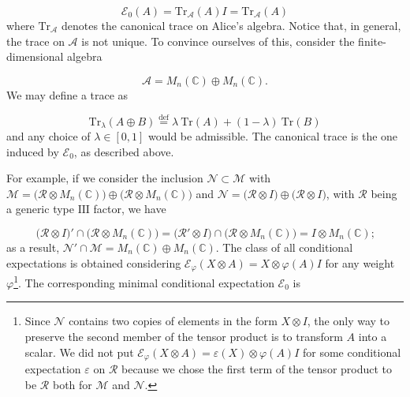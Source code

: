 \documentclass[a4paper,11pt]{article}
\newcommand{\eqdef}{\overset{\mathrm{def}}{=}}
\begin{document}
\begin{equation}
    \mathcal{E}_0 (A) = \mathrm{Tr}_{\mathcal{A}}(A) I = \mathrm{Tr}_{\mathcal{A}}(A)
    \label{A}
\end{equation}
%
where $\mathrm{Tr}_{\mathcal{A}}$ denotes the canonical trace on Alice's algebra. Notice that, in general, the trace on $\mathcal{A}$ is not unique. To convince ourselves of this, consider the finite-dimensional algebra

\begin{equation}
    \mathcal{A} = M_n(\mathbb{C}) \oplus M_n(\mathbb{C}) \text{.}
\end{equation}
%
We may define a trace as

\begin{equation}
    \mathrm{Tr}_{\lambda}(A \oplus B) \eqdef \lambda \ \mathrm{Tr}(A) + (1-\lambda) \ \mathrm{Tr}(B)
    \label{lambda}
\end{equation}
%
and any choice of $\lambda \in [0, 1]$ would be admissible. The canonical trace is the one induced by $\mathcal{E}_0$, as described above. 

For example, if we consider the inclusion $\mathcal{N} \subset \mathcal{M}$ with $\mathcal{M} = \big( \mathcal{R} \otimes M_n(\mathbb{C}) \big) \oplus \big( \mathcal{R} \otimes M_n(\mathbb{C}) \big)$ and $\mathcal{N} = \big( \mathcal{R} \otimes I \big) \oplus \big( \mathcal{R} \otimes I \big)$, with $\mathcal{R}$ being a generic type $\mathrm{III}$ factor, we have

\begin{equation}
    \big( \mathcal{R} \otimes I \big)' \cap \big( \mathcal{R} \otimes M_n(\mathbb{C}) \big) = \big( \mathcal{R}' \otimes I \big) \cap \big( \mathcal{R} \otimes M_n(\mathbb{C}) \big) = I \otimes M_n(\mathbb{C}) \text{;}
\end{equation}
%
as a result, $\mathcal{N}' \cap \mathcal{M} = M_n(\mathbb{C}) \oplus M_n(\mathbb{C})$. The class of all conditional expectations is obtained considering $\mathcal{E}_{\varphi}(X \otimes A) = X \otimes \varphi(A) I$ for any weight $\varphi$\footnote{Since $\mathcal{N}$ contains two copies of elements in the form $X \otimes I$, the only way to preserve the second member of the tensor product is to transform $A$ into a scalar. We did not put $\mathcal{E}_{\varphi}(X \otimes A) = \varepsilon(X) \otimes \varphi(A) I$ for some conditional expectation $\varepsilon$ on $\mathcal{R}$ because we chose the first term of the tensor product to be $\mathcal{R}$ both for $\mathcal{M}$ and $\mathcal{N}$.}. The corresponding minimal conditional expectation $\mathcal{E}_0$ is
\end{document}
